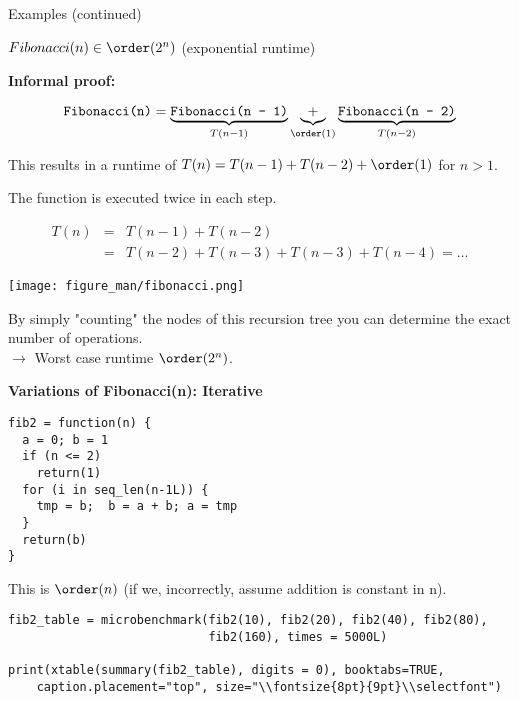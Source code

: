 \documentclass[11pt,compress,t,notes=noshow, xcolor=table]{beamer}
\begin{document}
\begin{vbframe}{Examples (continued)}
\framebreak

$Fibonacci(n) \in \order(2^n)$ (exponential runtime) \\

\lz

\textbf{Informal proof:}

$$
\texttt{Fibonacci(n)} = \underbrace{\texttt{Fibonacci(n - 1)}}_{T(n-1)} \underbrace{+}_{\order(1)} \underbrace{\texttt{Fibonacci(n - 2)}}_{T(n-2)}
$$

This results in a runtime of $T(n) = T(n-1) + T(n-2) + \order(1)$ for $n >1$.

\lz

The function is executed twice in each step.

\begin{eqnarray*}
  T(n) &=& T(n-1) + T(n-2)  \\
  &=& T(n-2) + T(n-3) + T(n-3) + T(n-4) = \ldots
\end{eqnarray*}

\framebreak

\begin{center}
\texttt{[image: figure\_man/fibonacci.png]}
\end{center}

By simply "counting" the nodes of this recursion tree you can determine the exact number of operations. \\
$\to$ Worst case runtime $\order(2^n)$.

\framebreak


\textbf{Variations of Fibonacci(n): Iterative}
\begin{scriptsize}
\begin{verbatim}
fib2 = function(n) {
  a = 0; b = 1
  if (n <= 2)
    return(1)
  for (i in seq_len(n-1L)) {
    tmp = b;  b = a + b; a = tmp
  }
  return(b)
}
\end{verbatim}
\end{scriptsize}
This is $\order(n)$ (if we, incorrectly, assume addition is constant in n).

\framebreak
\begin{scriptsize}
\begin{verbatim}
fib2_table = microbenchmark(fib2(10), fib2(20), fib2(40), fib2(80), 
                            fib2(160), times = 5000L)

print(xtable(summary(fib2_table), digits = 0), booktabs=TRUE, 
    caption.placement="top", size="\\fontsize{8pt}{9pt}\\selectfont")
\end{verbatim}


\end{scriptsize}
\end{vbframe}
\end{document}
